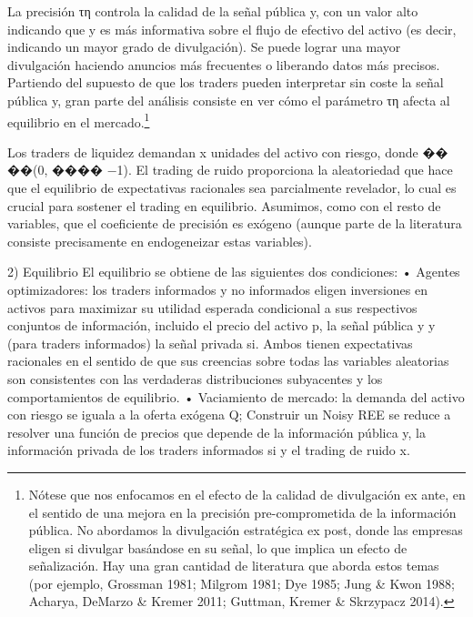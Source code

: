 \documentclass[10pt,a4paper]{article}
\begin{document}
La precisión τη controla la calidad de la señal pública y, con un valor alto indicando que y es más informativa sobre el flujo de efectivo del activo (es decir, indicando un mayor grado de divulgación). Se puede lograr una mayor divulgación haciendo anuncios más frecuentes o liberando datos más precisos. Partiendo del supuesto de que los traders pueden interpretar sin coste la señal pública y, gran parte del análisis consiste en ver cómo el parámetro τη afecta al equilibrio en el mercado.\footnote{%
    Nótese que nos enfocamos en el efecto de la calidad de divulgación ex ante, en el sentido de una mejora en la precisión pre-comprometida de la información pública. No abordamos la divulgación estratégica ex post, donde las empresas eligen si divulgar basándose en su señal, lo que implica un efecto de señalización. Hay una gran cantidad de literatura que aborda estos temas (por ejemplo, Grossman 1981; Milgrom 1981; Dye 1985; Jung \& Kwon 1988; Acharya, DeMarzo \& Kremer 2011; Guttman, Kremer \& Skrzypacz 2014).
} 

Los traders de liquidez demandan x unidades del activo con riesgo, donde �� ~ ��(0, ���� −1). El trading de ruido proporciona la aleatoriedad que hace que el equilibrio de expectativas racionales sea parcialmente revelador, lo cual es crucial para sostener el trading en equilibrio. Asumimos, como con el resto de variables, que el coeficiente de precisión es exógeno (aunque parte de la literatura consiste precisamente en endogeneizar estas variables).

2) Equilibrio
El equilibrio se obtiene de las siguientes dos condiciones: • Agentes optimizadores: los traders informados y no informados eligen inversiones en activos para maximizar su utilidad esperada condicional a sus respectivos conjuntos de información, incluido el precio del activo p, la señal pública y y (para traders informados) la señal privada si. Ambos tienen expectativas racionales en el sentido de que sus creencias sobre todas las variables aleatorias son consistentes con las verdaderas distribuciones subyacentes y los comportamientos de equilibrio. • Vaciamiento de mercado: la demanda del activo con riesgo se iguala a la oferta exógena Q; Construir un Noisy REE se reduce a resolver una función de precios que depende de la información pública y, la información privada de los traders informados si y el trading de ruido x.
\end{document}
